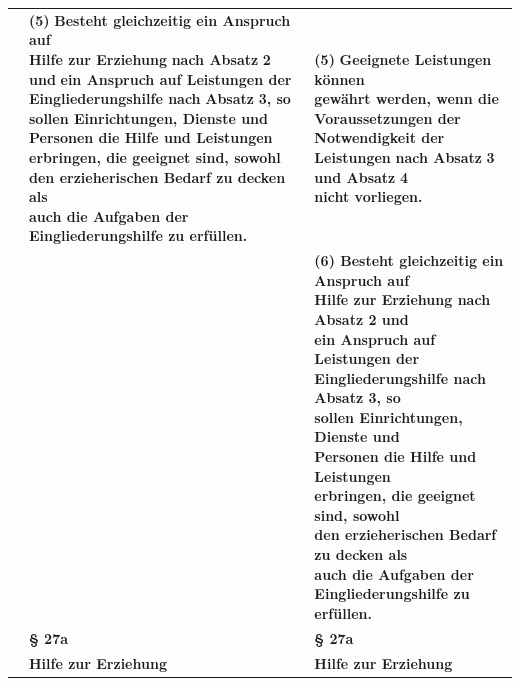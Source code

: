 \documentclass[10pt,a4paper,landscape]{article}
\begin{document}
\begin{longtable}{|L{8.2cm}|L{8.2cm}|L{8.2cm}|}
 & \textbf{(5) }\textbf{\textcolor{diffred}{Besteht gleichzeitig ein Anspruch auf  \newline Hilfe zur Erziehung}}\textbf{ nach Absatz }\textbf{\textcolor{diffred}{2}}\textbf{ und} \newline \textbf{\textcolor{diffred}{ein Anspruch auf Leistungen der  \newline Eingliederungshilfe nach}}\textbf{ Absatz }\textbf{\textcolor{diffred}{3, so  \newline sollen Einrichtungen, Dienste und  \newline Personen die Hilfe und Leistungen  \newline erbringen, die geeignet sind, sowohl  \newline den erzieherischen Bedarf zu decken als  \newline auch die Aufgaben der  \newline Eingliederungshilfe zu erfüllen.}} & \textbf{(5) }\textbf{\textcolor{diffgreen}{Geeignete Leistungen können  \newline gewährt werden, wenn die  \newline Voraussetzungen der Notwendigkeit der  \newline Leistungen}}\textbf{ nach Absatz }\textbf{\textcolor{diffgreen}{3}}\textbf{ und Absatz }\textbf{\textcolor{diffgreen}{4  \newline nicht vorliegen.}} \\
\hhline{|---|}
 &  & \textbf{\textcolor{diffgreen}{(6) Besteht gleichzeitig ein Anspruch auf  \newline Hilfe zur Erziehung nach Absatz 2 und  \newline ein Anspruch auf Leistungen der  \newline Eingliederungshilfe nach Absatz 3, so  \newline sollen Einrichtungen, Dienste und  \newline Personen die Hilfe und Leistungen  \newline erbringen, die geeignet sind, sowohl  \newline den erzieherischen Bedarf zu decken als  \newline auch die Aufgaben der  \newline Eingliederungshilfe zu erfüllen.}} \\
\hhline{|---|}
 & \textbf{\S{} 27a } & \textbf{\S{} 27a } \\
\hhline{|---|}
 & \textbf{Hilfe zur Erziehung } & \textbf{Hilfe zur Erziehung } \\

\end{longtable}
\end{document}
